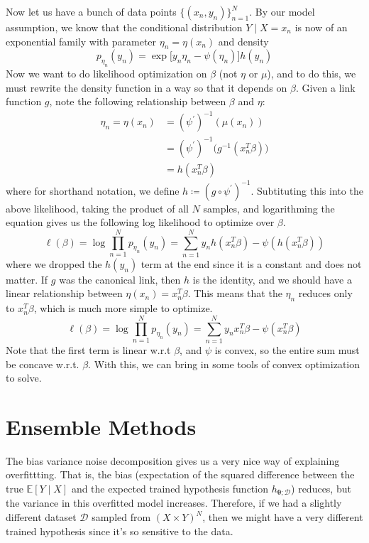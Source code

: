 \documentclass{article}
\begin{document}
    Now let us have a bunch of data points $\{(x_n, y_n)\}_{n=1}^N$. By our model assumption, we know that the conditional distribution $Y \mid X = x_n$ is now of an exponential family with parameter $\eta_n = \eta (x_n)$ and density 
    \[p_{\eta_n} (y_n) = \exp \big[ y_n \eta_n - \psi(\eta_n) \big] h(y_n)\]
    Now we want to do likelihood optimization on $\beta$ (not $\eta$ or $\mu$), and to do this, we must rewrite the density function in a way so that it depends on $\beta$. Given a link function $g$, note the following relationship between $\beta$ and $\eta$: 
    \begin{align*}
        \eta_n = \eta (x_n) & = (\psi^\prime)^{-1} (\mu (x_n)) \\
        & = (\psi^{\prime})^{-1} \big( g^{-1} (x_n^T \beta )\big) \\
        & = h(x_n^T \beta) 
    \end{align*}
    where for shorthand notation, we define $h \coloneqq (g \circ \psi^\prime)^{-1}$. Subtituting this into the above likelihood, taking the product of all $N$ samples, and logarithming the equation gives us the following log likelihood to optimize over $\beta$. 
    \[\ell(\beta) = \log \prod_{n=1}^N p_{\eta_n} (y_n) = \sum_{n=1}^N y_n h(x_n^T \beta)  - \psi(h(x_n^T \beta) )\]
    where we dropped the $h(y_n)$ term at the end since it is a constant and does not matter. If $g$ was the canonical link, then $h$ is the identity, and we should have a linear relationship between $\eta (x_n) = x_n^T \beta$. This means that the $\eta_n$ reduces only to $x_n^T \beta$, which is much more simple to optimize. 
    \[\ell(\beta) = \log \prod_{n=1}^N p_{\eta_n} (y_n) = \sum_{n=1}^N y_n x_n^T \beta - \psi(x_n^T \beta)\]
    Note that the first term is linear w.r.t $\beta$, and $\psi$ is convex, so the entire sum must be concave w.r.t. $\beta$. With this, we can bring in some tools of convex optimization to solve. 

\section{Ensemble Methods}

    The bias variance noise decomposition gives us a very nice way of explaining overfittting. That is, the bias (expectation of the squared difference between the true $\mathbb{E}[Y \mid X]$ and the expected trained hypothesis function $h_{\boldsymbol{\theta}; \mathcal{D}}$) reduces, but the variance in this overfitted model increases. Therefore, if we had a slightly different dataset $\mathcal{D}$ sampled from $(X \times Y)^N$, then we might have a very different trained hypothesis since it's so sensitive to the data. 
\end{document}
